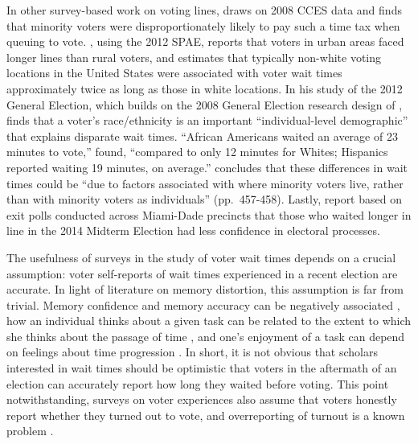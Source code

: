 \documentclass[12pt,titlepage]{article}
\begin{document}


In other survey-based work on voting lines, \cite{mukherjee:timetax}
draws on 2008 CCES data and finds that minority voters were
disproportionately likely to pay such a time tax when queuing to vote.
\citet{kimball:voting}, using the 2012 SPAE, reports that voters in
urban areas faced longer lines than rural voters, and
\citet{pettigrew:racegapwaittimes} estimates that typically non-white
voting locations in the United States were associated with voter wait
times approximately twice as long as those in white locations. In his
study of the 2012 General Election, which builds on the 2008 General
Election research design of \citet{alvarez:survey},
\cite{stewart:waitingtovote2012} finds that a voter's race/ethnicity
is an important ``individual-level demographic'' that explains
disparate wait times. ``African Americans waited an average of 23
minutes to vote,'' \citeauthor{stewart:waitingtovote2012} found,
``compared to only 12 minutes for Whites; Hispanics reported waiting
19 minutes, on average.'' \citeauthor{stewart:waitingtovote2012}
concludes that these differences in wait times could be ``due to
factors associated with where minority voters live, rather than with
minority voters as individuals'' (pp.\ 457-458). Lastly,
\cite{herron:confidence} report based on exit polls conducted across
Miami-Dade precincts that those who waited longer in line in the 2014
Midterm Election had less confidence in electoral processes.

The usefulness of surveys in the study of voter wait times depends on
a crucial assumption: voter self-reports of wait times experienced in
a recent election are accurate.  In light of literature on memory
distortion, this assumption is far from trivial. Memory confidence and
memory accuracy can be negatively associated
\citep{hirstetal:sept11memories}, how an individual thinks
about a given task can be related to the extent to which she thinks
about the passage of time \citep{conti:timeflies}, and one's enjoyment
of a task can depend on feelings about time progression
\citep{sackettetal:timeflies}.  In short, it is not obvious
that scholars interested in wait times should be optimistic that
voters in the aftermath of an election can accurately report how long
they waited before voting.  This point notwithstanding, surveys on voter
experiences also assume that voters honestly report whether they turned out
to vote, and overreporting of turnout is a known problem
\citep{ansolhersh:bigdata}.
\end{document}

